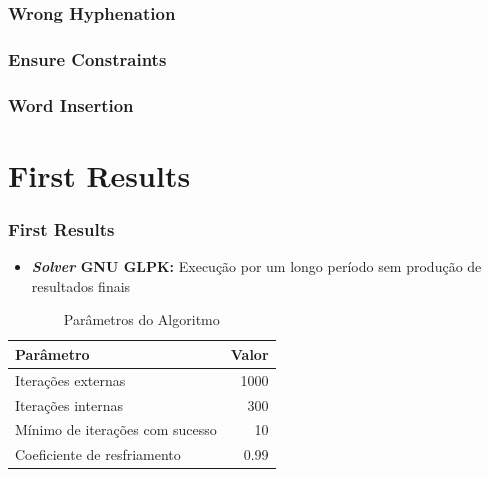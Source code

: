 \documentclass{beamer}
\begin{document}
\begin{frame}



\end{frame}











\begin{frame}
\frametitle{Wrong Hyphenation}

 
\end{frame}

\begin{frame}
\frametitle{Ensure Constraints}
\end{frame}

\begin{frame}
\frametitle{Word Insertion}
\end{frame}

\section{First Results}

\begin{frame}
\frametitle{First Results}
\begin{itemize}
\item \textbf{\emph{Solver} GNU GLPK:} Execução por um longo período sem produção de resultados finais
\end{itemize}
\begin{table}[H]
\centering
\begin{tabular}{|l | r |}
	\hline
	\textbf{Parâmetro} & \textbf{Valor} \\ \hline
	Iterações externas		& 1000	\\ \hline
	Iterações internas		& 300	\\ \hline
	Mínimo de iterações com sucesso	& 10 	\\ \hline
	Coeficiente de resfriamento		& 0.99	\\ \hline
\end{tabular}
\caption{Parâmetros do Algoritmo}
\label{tab:Parametros}
\end{table}
\end{frame}
\end{document}
